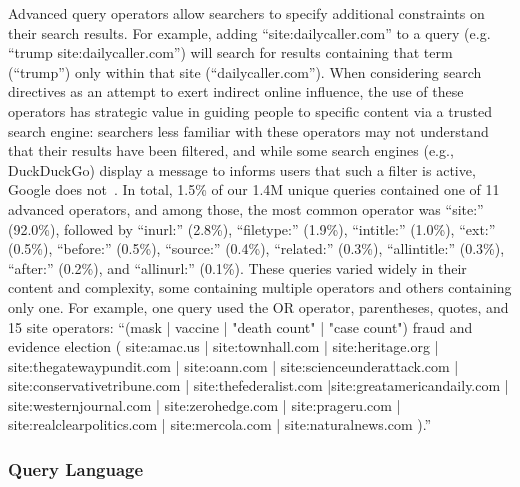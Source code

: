 Advanced query operators allow searchers to specify additional constraints on their search results.
For example, adding ``site:dailycaller.com'' to a query (e.g. ``trump site:dailycaller.com'') will search for results containing that term (``trump'') only within that site (``dailycaller.com'').
When considering search directives as an attempt to exert indirect online influence, the use of these operators has strategic value in guiding people to specific content via a trusted search engine: searchers less familiar with these operators may not understand that their results have been filtered, and while some search engines (e.g., DuckDuckGo) display a message to informs users that such a filter is active, Google does not~\citep{robertson2023identifying}.
In total, 1.5\% of our 1.4M unique queries contained one of 11 advanced operators, and among those, the most common operator was ``site:'' (92.0\%), followed by ``inurl:'' (2.8\%), ``filetype:'' (1.9\%), ``intitle:'' (1.0\%), ``ext:'' (0.5\%), ``before:'' (0.5\%), ``source:'' (0.4\%), ``related:'' (0.3\%), ``allintitle:'' (0.3\%), ``after:'' (0.2\%), and ``allinurl:'' (0.1\%).
These queries varied widely in their content and complexity, some containing multiple operators and others containing only one.
For example, one query used the OR operator, parentheses, quotes, and 15 site operators: ``(mask | vaccine | "death count" | "case count") fraud and evidence election ( site:amac.us | site:townhall.com | site:heritage.org | site:thegatewaypundit.com | site:oann.com | site:scienceunderattack.com | site:conservativetribune.com |  site:thefederalist.com |site:greatamericandaily.com | \\ site:westernjournal.com | site:zerohedge.com | site:prageru.com | site:realclearpolitics.com | site:mercola.com | site:naturalnews.com ).''

\subsubsection{Query Language}
\label{sec:methods-queries-language}

